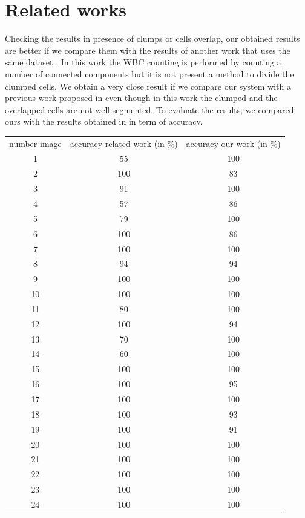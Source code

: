 \section{Related works}
Checking the results in presence of clumps or cells overlap, our obtained results are better if we compare them with the results of another work that uses the same dataset \cite{otherwork}. In this work the WBC counting is performed by counting a number of connected components but it is not present a method to divide the clumped cells. We obtain a very close result if we compare our system with a previous work proposed in \cite{dirub} even though in this work the clumped and the overlapped cells are not well segmented. To evaluate the results, we compared ours with the results obtained in \cite{water} in term of accuracy. 
\begin{table}
\begin{tabular}{|c|c|c|}
\hline
number image &  accuracy related work (in \%) & accuracy our work (in \%)\\ 
1 &  55 & 100 \\ 
\hline
2 &  100 & 83 \\ 
\hline 
3 &  91 & 100 \\ 
\hline
4 &  57 & 86 \\ 
\hline
5 &  79 & 100 \\ 
\hline
6 &  100 & 86 \\ 
\hline
7 &  100 & 100 \\ 
\hline
8 &  94 & 94 \\ 
\hline
9 &  100 & 100 \\ 
\hline
10 &  100 & 100 \\ 
\hline
11 &  80 & 100 \\ 
\hline
12 &  100 & 94 \\ 
\hline
13 &  70 & 100 \\ 
\hline
14 &  60 & 100 \\ 
\hline
15 &  100 & 100 \\ 
\hline
16 &  100 & 95 \\ 
\hline
17 &  100 & 100 \\ 
\hline
18 &  100 & 93 \\ 
\hline
19 &  100 & 91 \\ 
\hline
20 &  100 & 100 \\ 
\hline
21 &  100 & 100 \\ 
\hline
22 &  100 & 100 \\ 
\hline
23 &  100 & 100 \\ 
\hline
24 &  100 & 100 \\ 

\end{tabular}
\end{table}
